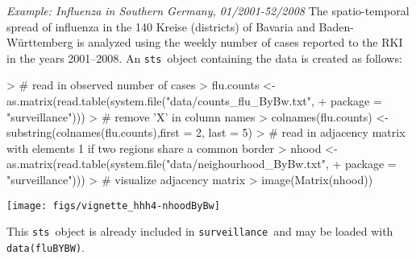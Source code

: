 \documentclass[a4paper,11pt]{article}
\newcommand{\surveillance}{\texttt{surveillance}}
\newcommand{\code}[1]{\texttt{#1}}
\newcommand{\sts}{\texttt{sts}}
\newcommand{\example}[1]{\textit{Example: #1}}
\begin{document}
\example{Influenza in Southern Germany, 01/2001-52/2008}
The spatio-temporal spread of influenza in the 140 Kreise (districts) 
of Bavaria and Baden-W\"urttemberg  is analyzed using the weekly number of 
cases reported to the RKI~\citep{survstat-fluByBw} in the years 2001--2008.
An \sts\ object containing the data is created as follows:
\begin{Schunk}
\begin{Sinput}
> # read in observed number of cases
> flu.counts <- as.matrix(read.table(system.file("data/counts_flu_ByBw.txt", 
+                                       package = "surveillance")))
> # remove 'X' in column names                                      
> colnames(flu.counts) <- substring(colnames(flu.counts),first = 2, last = 5)                                      
> # read in adjacency matrix with elements 1 if two regions share a common border
> nhood <- as.matrix(read.table(system.file("data/neighourhood_ByBw.txt",
+                                       package = "surveillance")))
> # visualize adjacency matrix
> image(Matrix(nhood))
\end{Sinput}
\end{Schunk}
\begin{center}
\vspace*{-2em}
\texttt{[image: figs/vignette\_hhh4-nhoodByBw]}
\end{center}
\begin{Schunk}
\end{Schunk}
This \sts\ object is already included in \surveillance\ and may be
loaded with \code{data(fluBYBW)}.
\end{document}
